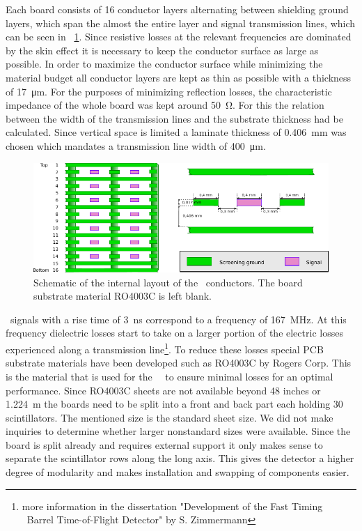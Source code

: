 \documentclass[../BTOF_summary.tex]{subfiles}
\begin{document}
Each board consists of 16 conductor layers alternating between shielding ground layers, which span the almost the entire layer and signal transmission lines, which can be seen in \fig ~\ref{fig:Railboard3_schematic}.
Since resistive losses at the relevant frequencies are dominated by the skin effect it is necessary to keep the conductor surface as large as possible.
In order to maximize the conductor surface while minimizing the material budget all conductor layers are kept as thin as possible with a thickness of \SI{17}{\micro \meter}.
For the purposes of minimizing reflection losses, the characteristic impedance of the whole board was kept around \SI{50}{\ohm}.
For this the relation between the width of the transmission lines and the substrate thickness had be calculated.
Since vertical space is limited a laminate thickness of \SI{0.406}{mm} was chosen which mandates a transmission line width of \SI{400}{\micro m}.

\begin{figure}[htbp]
	\centering
	\includegraphics[width=.9\textwidth]{fig/Railboard3_schematic.pdf}
	\caption{Schematic of the internal layout of the \railboard\ conductors. The board substrate material RO4003C is left blank.}
	\label{fig:Railboard3_schematic}
\end{figure}

\sipm\ signals with a rise time of \SI{3}{ns} correspond to a frequency of \SI{167}{MHz}.
At this frequency dielectric losses start to take on a larger portion of the electric losses experienced along a transmission line\footnote{more information in the dissertation "Development of the Fast Timing \panda\ Barrel Time-of-Flight Detector" by S. Zimmermann}.
To reduce these losses special PCB substrate materials have been developed such as RO4003C by Rogers Corp.
This is the material that is used for the \btof\ \railboard\ to ensure minimal losses for an optimal performance.
Since RO4003C sheets are not available beyond 48 inches or \SI{1.224}{m} the boards need to be split into a front and back part each holding 30 scintillators.
The mentioned size is the standard sheet size.
We did not make inquiries to determine whether larger nonstandard sizes were available.
Since the board is split already and requires external support it only makes sense to separate the scintillator rows along the long axis.
This gives the detector a higher degree of modularity and makes installation and swapping of components easier.
\end{document}
